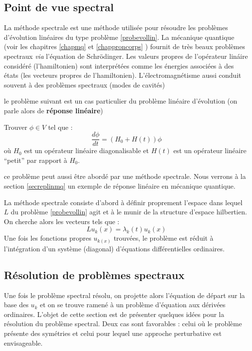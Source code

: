 \documentclass[12pt]{book}
\begin{document}
\subsection{Point de vue spectral}

La m\'ethode spectrale est une m\'ethode utilis\'ee pour r\'esoudre les
probl\`emes d'\'evolution lin\'eaires du type probl\`eme \ref{probevollin}.
La m\'ecanique quantique (voir les chapitres \ref{chapmq} et
\ref{chapproncorps} ) fournit de tr\`es 
beaux probl\`emes spectraux 
{\it via} l'\'equation de Schr\"odinger.
Les valeurs propres de l'op\'erateur lin\'aire consid\'er\'e (l'hamiltonien)
sont interpr\'et\'ees comme les \'energies associ\'ees \`a des \'etats (les
vecteurs propres de l'hamiltonien).
L'\'electromagn\'etisme aussi conduit souvent  \`a des
probl\`emes spectraux (modes de cavit\'es)


le probl\`eme suivant est un cas particulier du probl\`eme lin\'eaire
d'\'evolution   (on parle alors de {\bf r\'eponse
  lin\'eaire}) 
\begin{prob} 
Trouver $\phi\in V$ tel que :
\begin{equation}
\frac{d\phi}{dt}=(H_0+H(t))\phi
\end{equation}
o\`u $H_0$ est un op\'erateur lin\'eaire  diagonalisable 
et $H(t)$ est  un op\'erateur lin\'eaire
``petit'' par rapport \`a $H_0$.
\end{prob}
ce probl\`eme peut aussi  \^etre abord\'e par une
m\'ethode spectrale.
Nous verrons \`a la section \ref{secreplinmq} un exemple de r\'eponse
  lin\'eaire en m\'ecanique quantique.



La m\'ethode spectrale consiste d'abord \`a d\'efinir proprement l'espace dans
lequel $L$ du probl\`eme  \ref{probevollin} agit 
et \`a le munir de la structure d'espace hilbertien.
On cherche alors les vecteurs tels que :
\begin{equation}
Lu_k(x)=\lambda_k(t)u_k(x)
\end{equation}
Une fois les fonctions propres $u_{k(x)}$ trouv\'ees, le probl\`eme est
r\'eduit \`a l'int\'egration d'un syst\`eme (diagonal) d'\'equations
diff\'erentielles ordinaires.



\subsection{R\'esolution de probl\`emes spectraux}\label{chapresospec}
Une fois le probl\`eme spectral r\'esolu, on
 projette alors l'\'equation de d\'epart sur la base des
$u_k$  et on se trouve ramen\'e \`a un probl\`eme d'\'equation aux
d\'eriv\'ees ordinaires.
L'objet de cette section est de pr\'esenter quelques id\'ees pour la
r\'esolution du probl\`eme spectral.
Deux cas sont favorables : celui o\`u le probl\`eme pr\'esente des sym\'etries
et celui pour lequel une approche perturbative est envisageable.
\end{document}

